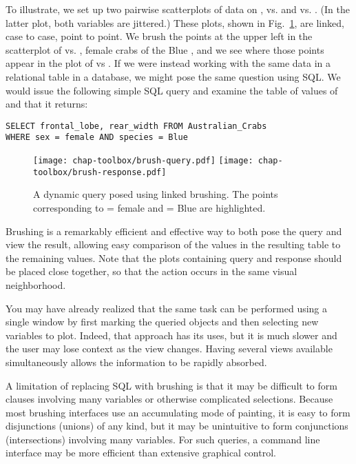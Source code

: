 
To illustrate, we set up two pairwise scatterplots of data on
,  vs. 
and  vs. . (In the latter plot, both
variables are jittered.)  These plots, shown in Fig.~\ref{query}, are
linked, case to case, point to point.  We brush the points at the
upper left in the scatterplot of  vs. ,
female crabs of the Blue , and we see where those points
appear in the plot of  vs .  If we
were instead working with the same data in a relational table in a
database, we might pose the same question using SQL.  We would issue
the following simple SQL query and examine the table of values of
 and  that it returns:

\begin{verbatim}
SELECT frontal_lobe, rear_width FROM Australian_Crabs
WHERE sex = female AND species = Blue
\end{verbatim}

\begin{figure}[htp]
\centerline{
  \texttt{[image: chap-toolbox/brush-query.pdf]}
  \texttt{[image: chap-toolbox/brush-response.pdf]}
}
\caption[A dynamic query posed using linked brushing]{A dynamic query
posed using linked brushing.  The points corresponding to  =
female and  = Blue are highlighted.}
\label{query}
\end{figure}

Brushing is a remarkably efficient and effective way to both pose the
query  and view the result, allowing easy comparison
of the values in the resulting table to the remaining values.  Note
that the plots containing query and response should be placed close
together, so that the action occurs in the same visual neighborhood.

You may have already realized that the same task can be performed
using a single window by first marking the queried objects and then
selecting new variables to plot.  Indeed, that approach has its uses,
but it is much slower and the user may lose context as the view
changes. Having several views available simultaneously allows the
information to be rapidly absorbed.

A limitation of replacing SQL with brushing is that it may be
difficult to form clauses involving many variables or otherwise
complicated selections.  Because most brushing interfaces use an
accumulating mode of painting, it is easy to form disjunctions
(unions) of any kind, but it may be unintuitive to form conjunctions
(intersections) involving many variables. For such queries, a command
line interface may be more efficient than extensive graphical control.

